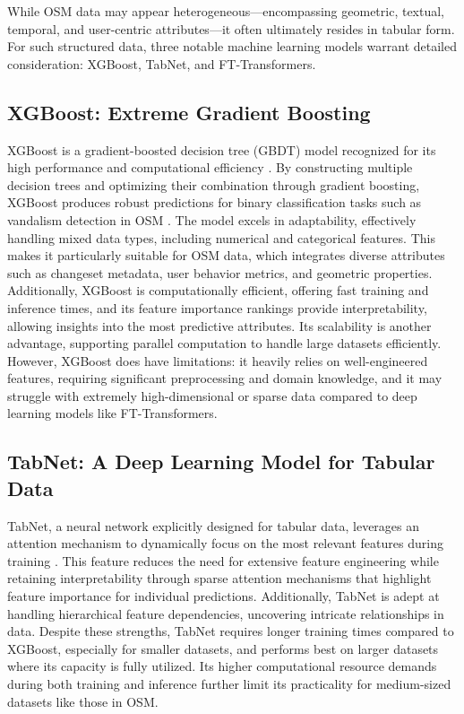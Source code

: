 \documentclass[
    13pt, %
    a4paper, %
    twoside, 
    DIV14, %
    listof=totoc, %
    bibliography=totoc, %
    index=totoc, %
    headsepline
]{scrreprt}
\begin{document}
While OSM data may appear heterogeneous—encompassing geometric, textual, temporal, and user-centric attributes—it often ultimately resides in tabular form. For such structured data, three notable machine learning models warrant detailed consideration: XGBoost, TabNet, and FT-Transformers.

\subsection{XGBoost: Extreme Gradient Boosting}
XGBoost is a gradient-boosted decision tree (GBDT) model recognized for its high performance and computational efficiency \cite{xgboost_paper}. By constructing multiple decision trees and optimizing their combination through gradient boosting, XGBoost produces robust predictions for binary classification tasks such as vandalism detection in OSM \cite{Chen2016}. The model excels in adaptability, effectively handling mixed data types, including numerical and categorical features. This makes it particularly suitable for OSM data, which integrates diverse attributes such as changeset metadata, user behavior metrics, and geometric properties. Additionally, XGBoost is computationally efficient, offering fast training and inference times, and its feature importance rankings provide interpretability, allowing insights into the most predictive attributes. Its scalability is another advantage, supporting parallel computation to handle large datasets efficiently. However, XGBoost does have limitations: it heavily relies on well-engineered features, requiring significant preprocessing and domain knowledge, and it may struggle with extremely high-dimensional or sparse data compared to deep learning models like FT-Transformers.

\subsection{TabNet: A Deep Learning Model for Tabular Data}
TabNet, a neural network explicitly designed for tabular data, leverages an attention mechanism to dynamically focus on the most relevant features during training \cite{Arik2021}. This feature reduces the need for extensive feature engineering while retaining interpretability through sparse attention mechanisms that highlight feature importance for individual predictions. Additionally, TabNet is adept at handling hierarchical feature dependencies, uncovering intricate relationships in data. Despite these strengths, TabNet requires longer training times compared to XGBoost, especially for smaller datasets, and performs best on larger datasets where its capacity is fully utilized. Its higher computational resource demands during both training and inference further limit its practicality for medium-sized datasets like those in OSM.
\end{document}
